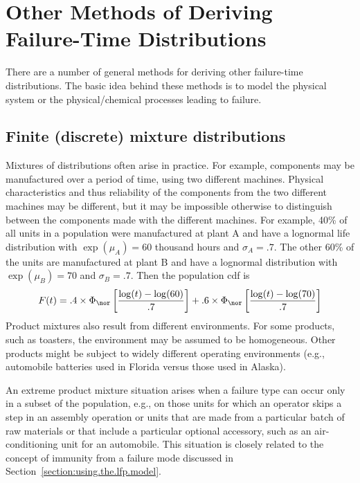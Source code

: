 \section{Other Methods of 
Deriving Failure-Time Distributions} 
\label{section:other.deriv}
There are a number of general
methods for deriving other failure-time distributions. The basic idea
behind these methods is to model the physical system
or the physical/chemical processes leading to failure.

\subsection{Finite (discrete) mixture distributions}
\label{section:discrete.mix.intro}
Mixtures of distributions often arise in practice.  For example,
components may be manufactured over a period of time, using two
different machines. Physical characteristics and thus
reliability of the components from the two
different machines may be different, but it may be impossible
otherwise to distinguish between the components made with the
different machines. For example, 40\% of all units in a population
were manufactured at plant A and have a lognormal life distribution
with $\exp(\mu_{A})=60$ thousand hours and $\sigma_{A}=.7$. The other
60\% of the units are manufactured at plant B and have a lognormal
distribution with $\exp(\mu_{B})=70$ and $\sigma_{B}=.7$. Then the
population cdf is
\begin{displaymath}
F(t)=.4\times \Phi_{\nor}\left [\frac{\log(t)-\log(60)}{.7}\right ] 
+.6\times\Phi_{\nor}
\left [ \frac{\log(t)-\log(70)}{.7} \right ]
\end{displaymath}
Product mixtures also result from different environments.  For some
products, such as toasters, the environment may be assumed to be
homogeneous.  Other products might be subject to widely different
operating environments (e.g., automobile batteries used in Florida
versus those used in Alaska).  

An extreme product mixture situation arises when a failure type can
occur only in a subset of the population, e.g., on those units for
which an operator skips a step in an assembly operation or units that
are made from a particular batch of raw materials or that include a
particular optional accessory, such as an air-conditioning unit for an
automobile.  This situation is closely related to the concept of
immunity from a failure mode discussed in
Section~\ref{section:using.the.lfp.model}.

